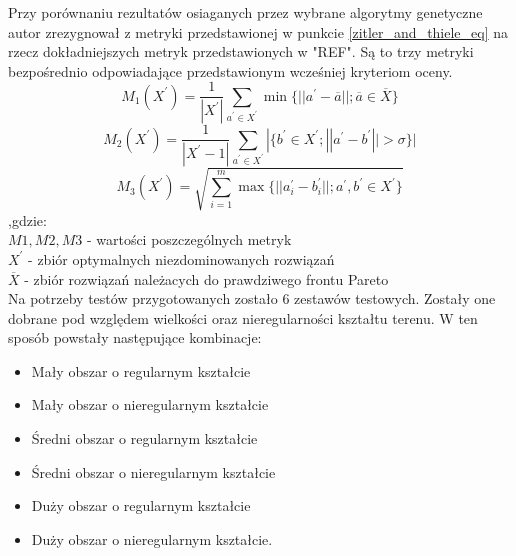 \documentclass[twoside]{iisthesis}
\begin{document}
Przy porównaniu rezultatów osiaganych przez wybrane algorytmy genetyczne autor zrezygnował z metryki przedstawionej w punkcie \ref{zitler_and_thiele_eq} na rzecz dokładniejszych metryk przedstawionych w "REF". Są to trzy metryki bezpośrednio odpowiadające przedstawionym wcześniej kryteriom oceny.
\begin{equation}
M_{1}(X^{'}) = \dfrac{1}{|X^{'}|}\sum_{a^{'} \in X^{'}}^{} \min \{{||a^{'} - \overline{a}||;\overline{a} \in \overline{X}}\}
\end{equation}
\begin{equation}
M_{2}(X^{'}) = \dfrac{1}{|X^{'} - 1|} \sum_{a^{'} \in X^{'}}^{} |\{b^{'} \in X^{'}; ||a^{'} - b^{'}|| > \sigma\}|
\end{equation}
\begin{equation}
M_{3}(X^{'}) = \sqrt{\sum_{i = 1}^{m} \max \{||a_{i}^{'} - b_{i}^{'}||;a^{'}, b^{'} \in X^{'}\}}
\end{equation}
,gdzie:\\
$M1,M2,M3$ - wartości poszczególnych metryk\\
$X^{'}$ - zbiór optymalnych niezdominowanych rozwiązań\\
$\overline{X}$ - zbiór rozwiązań należacych do prawdziwego frontu Pareto\\


Na potrzeby testów przygotowanych zostało 6 zestawów testowych. Zostały one dobrane pod względem wielkości oraz nieregularności kształtu terenu. W ten sposób powstały następujące kombinacje:
\begin{itemize}
	\item Mały obszar o regularnym kształcie
	\item Mały obszar o nieregularnym kształcie
	\item Średni obszar o regularnym kształcie
	\item Średni obszar o nieregularnym kształcie
	\item Duży obszar o regularnym kształcie
	\item Duży obszar o nieregularnym kształcie.\\
\end{itemize}
\end{document}
